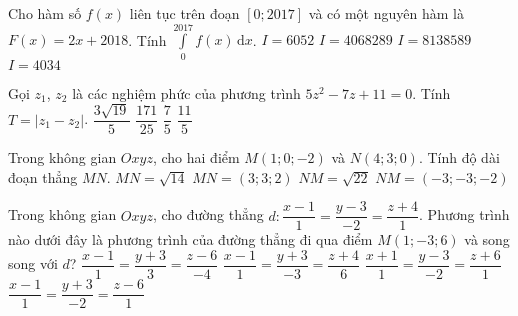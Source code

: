 \begin{ex}%
	Cho hàm số $ f(x) $ liên tục trên đoạn $ [0;2017] $ và có một nguyên hàm là $ F(x)=2x+2018 $. Tính $ \displaystyle\int\limits_0^{2017}f(x)\mathrm{\,d}x $.
	\choice
	{$ I=6052 $}
	{$ I=4068289 $}
	{$ I=8138589 $}
	{\True $ I=4034 $}
\end{ex}
\begin{ex}%
	Gọi $ z_1 $, $ z_2 $ là các nghiệm phức của phương trình $ 5z^2-7z+11=0 $. Tính $ T=|z_1-z_2| $.
	\choice
	{\True $ \dfrac{3\sqrt{19}}{5} $}
	{$ \dfrac{171}{25} $}
	{$ \dfrac{7}{5} $}
	{$ \dfrac{11}{5} $}
\end{ex}
\begin{ex}%
	Trong không gian $ Oxyz $, cho hai điểm $ M(1;0;-2) $ và $ N(4;3;0) $. Tính độ dài đoạn thẳng $ MN $.
	\choice
	{$ MN=\sqrt{14} $}
	{$ MN=(3;3;2) $}
	{\True $ NM=\sqrt{22} $}
	{$ NM=(-3;-3;-2) $}
\end{ex}
\begin{ex}%
	Trong không gian $ Oxyz $, cho đường thẳng $ d\colon \dfrac{x-1}{1}=\dfrac{y-3}{-2}=\dfrac{z+4}{1} $. Phương trình nào dưới đây là phương trình của đường thẳng đi qua điểm $ M(1;-3;6) $ và song song với $ d $?
	\choice
	{$ \dfrac{x-1}{1}=\dfrac{y+3}{3}=\dfrac{z-6}{-4} $}
	{$ \dfrac{x-1}{1}=\dfrac{y+3}{-3}=\dfrac{z+4}{6} $}
	{$ \dfrac{x+1}{1}=\dfrac{y-3}{-2}=\dfrac{z+6}{1} $}
	{\True $ \dfrac{x-1}{1}=\dfrac{y+3}{-2}=\dfrac{z-6}{1} $}
\end{ex}
